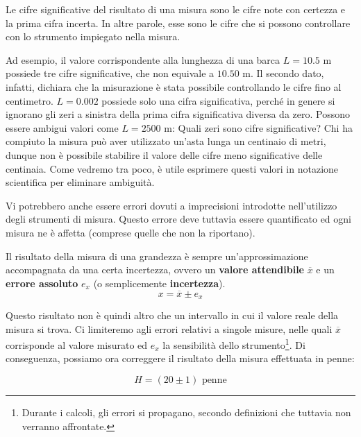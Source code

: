 \begin{tcolorbox}[colback = yellow!30, colframe = yellow!30!black, title = {Cifre significative del risultato di una misura}]
Le cifre significative del risultato di una misura sono le cifre note
con certezza e la prima cifra incerta. In altre parole, esse sono le cifre che si
possono controllare con lo strumento impiegato nella misura.
\end{tcolorbox}

\noindent Ad esempio, il valore corrispondente alla lunghezza di una barca $L = 10.5$ m
possiede tre cifre significative, che non equivale a $10.50$ m. Il secondo dato,
infatti, dichiara che la misurazione è stata possibile controllando le cifre
fino al centimetro. $L = 0.002$ possiede solo una cifra significativa, perché
in genere si ignorano gli zeri a sinistra della prima cifra significativa diversa
da zero. Possono essere ambigui valori come $L = 2500 \text{ m}$: Quali zeri sono
cifre significative? Chi ha compiuto la misura può aver utilizzato un'asta lunga
un centinaio di metri, dunque non è possibile stabilire il valore delle cifre
meno significative delle centinaia. Come vedremo tra poco, è utile esprimere questi valori in
notazione scientifica per eliminare ambiguità.

Vi potrebbero anche essere errori dovuti a imprecisioni introdotte nell'utilizzo
degli strumenti di misura. Questo errore deve tuttavia essere quantificato ed ogni
misura ne è affetta (comprese quelle che non la riportano).

\begin{tcolorbox}[colback = yellow!30, colframe = yellow!30!black, title = {Risultato della misura di una grandezza}]
Il risultato della misura di una grandezza è sempre un'approssimazione
accompagnata da una certa incertezza, ovvero un \textbf{valore attendibile} $\overline{x}$
e un \textbf{errore assoluto} $e_x$ (o semplicemente \textbf{incertezza}).
\[ x = \overline{x} \pm e_x  \]
\end{tcolorbox}

Questo risultato non è quindi altro che un intervallo in cui il valore reale
della misura si trova. Ci limiteremo agli errori relativi a singole misure,
nelle quali $\overline{x}$ corrisponde al valore misurato ed $e_x$ la sensibilità dello
strumento\footnote{Durante i calcoli, gli errori si propagano,
secondo definizioni che tuttavia non verranno affrontate.}. Di conseguenza, possiamo ora correggere il risultato della misura
effettuata in penne:

\[ H = (20 \pm 1) \text{ penne} \]

